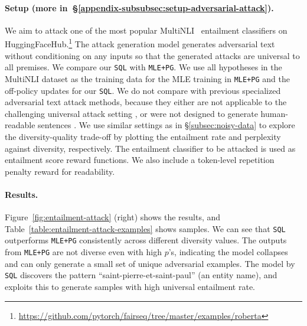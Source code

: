 \paragraph{Setup (more in~\S\ref{appendix-subsubsec:setup-adversarial-attack}).}
We aim to attack one of the most popular MultiNLI~\citep{williams2018broad} entailment classifiers on HuggingFaceHub.\footnote{\url{https://github.com/pytorch/fairseq/tree/master/examples/roberta}
} The attack generation model generates adversarial text without conditioning on any inputs so that the generated attacks are universal to all premises.  
We compare our \texttt{SQL} with \texttt{MLE+PG}. We use all hypotheses in the MultiNLI dataset as the training data for the MLE training in \texttt{MLE+PG} and the off-policy updates for our \texttt{SQL}.
We do not compare with previous specialized adversarial text attack methods, because they either are not applicable to the challenging universal attack setting \citep{morris2020textattack,jin2020bert,ebrahimi2017hotflip}, or were not designed to generate human-readable sentences \citep{wallace2019universal}. 
We use similar settings as in \S\ref{subsec:noisy-data} to explore the diversity-quality trade-off 
by plotting the entailment rate and perplexity against diversity, respectively. 
The entailment classifier to be attacked is used as entailment score reward functions. We also include a token-level repetition penalty reward for readability.


\paragraph{Results.}

Figure~\ref{fig:entailment-attack} (right) shows the results, and Table~\ref{table:entailment-attack-examples} shows samples.
We can see that \texttt{SQL} outperforms \texttt{MLE+PG} consistently across different diversity values. The outputs from \texttt{MLE+PG} are not diverse even with high $p$'s, indicating the model collapses and can only generate a small set of unique adversarial examples. 
The model by \texttt{SQL} discovers the pattern ``saint-pierre-et-saint-paul'' (an entity name), and exploits this to generate samples with high universal entailment rate.


